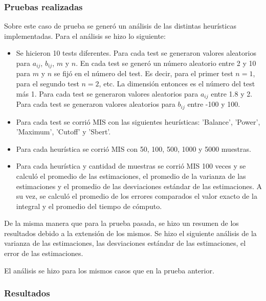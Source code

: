 \documentclass{article}
\begin{document}
\subsubsection{Pruebas realizadas}

Sobre este caso de prueba se generó un análisis de las distintas heurísticas implementadas.
Para el análisis se hizo lo siguiente:
\begin{itemize}
    \item Se hicieron 10 tests diferentes. Para cada test se generaron valores aleatorios para \( a_{ij} \), \( b_{ij} \), \( m \) y \( n \).
          En cada test se generó un número aleatorio entre 2 y 10 para \( m \) y \( n \) se fijó en el número del test.
          Es decir, para el primer test \( n = 1 \), para el segundo test \( n = 2 \), etc. La dimensión entonces es el número del test más 1.
          Para cada test se generaron valores aleatorios para \( a_{ij} \) entre 1.8 y 2.
          Para cada test se generaron valores aleatorios para \( b_{ij} \) entre -100 y 100.
    \item Para cada test se corrió MIS con las siguientes heurísticas: 'Balance', 'Power', 'Maximum', 'Cutoff' y 'Sbert'.
    \item Para cada heurística se corrió MIS con 50, 100, 500, 1000 y 5000 muestras.
    \item Para cada heurística y cantidad de muestras se corrió MIS 100 veces y se calculó el promedio de las estimaciones,
          el promedio de la varianza de las estimaciones y el promedio de las desviaciones estándar de las estimaciones.
          A su vez, se calculó el promedio de los errores comparados el valor exacto de la integral y el promedio del tiempo de cómputo.
\end{itemize}

De la misma manera que para la prueba pasada, se hizo un resumen de los resultados debido a la extensión de los mismos.
Se hizo el siguiente análisis de la varianza de las estimaciones, las desviaciones estándar de las estimaciones, el error de las estimaciones.

El análisis se hizo para los mismos casos que en la prueba anterior.

\subsubsection{Resultados}
\end{document}
